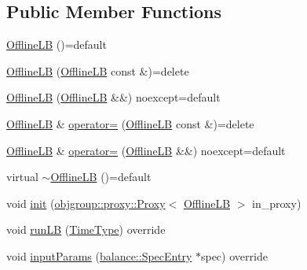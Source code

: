 \subsection*{Public Member Functions}
\begin{DoxyCompactItemize}
\item 
\hyperlink{structvt_1_1vrt_1_1collection_1_1lb_1_1_offline_l_b_a99528b3cbbb7cf3a3ffe298dd7f8b98a}{Offline\+LB} ()=default
\item 
\hyperlink{structvt_1_1vrt_1_1collection_1_1lb_1_1_offline_l_b_afb45e5b5adb6761c53877de9c4e7e4b1}{Offline\+LB} (\hyperlink{structvt_1_1vrt_1_1collection_1_1lb_1_1_offline_l_b}{Offline\+LB} const \&)=delete
\item 
\hyperlink{structvt_1_1vrt_1_1collection_1_1lb_1_1_offline_l_b_a26accbf7d8c123dc9594e64ec7eb8161}{Offline\+LB} (\hyperlink{structvt_1_1vrt_1_1collection_1_1lb_1_1_offline_l_b}{Offline\+LB} \&\&) noexcept=default
\item 
\hyperlink{structvt_1_1vrt_1_1collection_1_1lb_1_1_offline_l_b}{Offline\+LB} \& \hyperlink{structvt_1_1vrt_1_1collection_1_1lb_1_1_offline_l_b_a94affec36f4542b31b67748b17f577bb}{operator=} (\hyperlink{structvt_1_1vrt_1_1collection_1_1lb_1_1_offline_l_b}{Offline\+LB} const \&)=delete
\item 
\hyperlink{structvt_1_1vrt_1_1collection_1_1lb_1_1_offline_l_b}{Offline\+LB} \& \hyperlink{structvt_1_1vrt_1_1collection_1_1lb_1_1_offline_l_b_a2d6408b68d2f1eb5b59d78715e0915d5}{operator=} (\hyperlink{structvt_1_1vrt_1_1collection_1_1lb_1_1_offline_l_b}{Offline\+LB} \&\&) noexcept=default
\item 
virtual \hyperlink{structvt_1_1vrt_1_1collection_1_1lb_1_1_offline_l_b_a72e0da5f0731ce6290d8bbcc505e4d7a}{$\sim$\+Offline\+LB} ()=default
\item 
void \hyperlink{structvt_1_1vrt_1_1collection_1_1lb_1_1_offline_l_b_a872df3cf9b5018b990ef9029f7bf9110}{init} (\hyperlink{structvt_1_1objgroup_1_1proxy_1_1_proxy}{objgroup\+::proxy\+::\+Proxy}$<$ \hyperlink{structvt_1_1vrt_1_1collection_1_1lb_1_1_offline_l_b}{Offline\+LB} $>$ in\+\_\+proxy)
\item 
void \hyperlink{structvt_1_1vrt_1_1collection_1_1lb_1_1_offline_l_b_a8621ca0e36932e4271f62d9d8078bf3e}{run\+LB} (\hyperlink{namespacevt_a876a9d0cd5a952859c72de8a46881442}{Time\+Type}) override
\item 
void \hyperlink{structvt_1_1vrt_1_1collection_1_1lb_1_1_offline_l_b_a7d6ed6d7ec92fb86187715abacde2824}{input\+Params} (\hyperlink{structvt_1_1vrt_1_1collection_1_1balance_1_1_spec_entry}{balance\+::\+Spec\+Entry} $\ast$spec) override
\end{DoxyCompactItemize}

